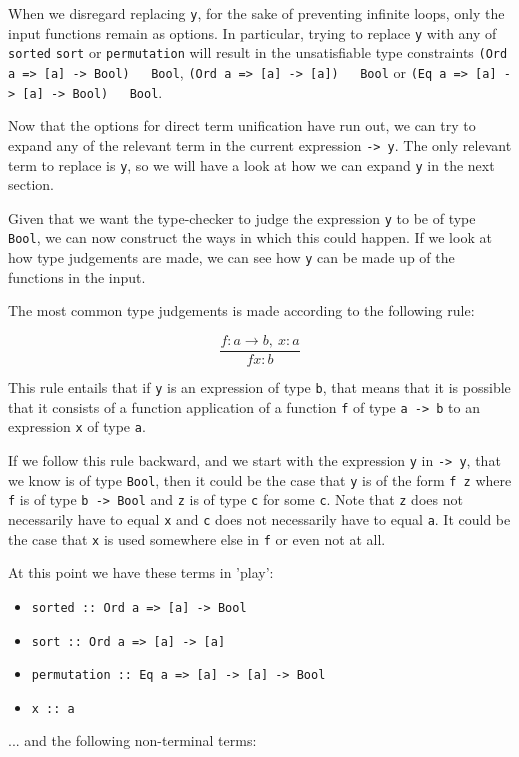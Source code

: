 \documentclass[a4paper, 11pt]{article}
\newcommand{\h}[1]{\texttt{#1}}
\begin{document}
When we disregard replacing \h{y}, for the sake of preventing infinite loops, only the input functions remain as options.
In particular, trying to replace \h{y} with any of \h{sorted} \h{sort} or \h{permutation} will result in the unsatisfiable type constraints \h{(Ord a => [a] -> Bool) ~ Bool}, \h{(Ord a => [a] -> [a]) ~ Bool} or \h{(Eq a => [a] -> [a] -> Bool) ~ Bool}.

Now that the options for direct term unification have run out, we can try to expand any of the relevant term in the current expression \h{\x -> y}.
The only relevant term to replace is \h{y}, so we will have a look at how we can expand \h{y} in the next section.


Given that we want the type-checker to judge the expression \h{y} to be of type \h{Bool}, we can now construct the ways in which this could happen.
If we look at how type judgements are made, we can see how \h{y} can be made up of the functions in the input.

The most common type judgements is made according to the following rule:

\[
  \frac{f : a \rightarrow b,\ x : a}{f x : b}
\]

This rule entails that if \h{y} is an expression of type \h{b}, that means that it is possible that it consists of a function application of a function \h{f} of type \h{a -> b} to an expression \h{x} of type \h{a}.

If we follow this rule backward, and we start with the expression \h{y} in \h{\x -> y}, that we know is of type \h{Bool}, then it could be the case that \h{y} is of the form \h{f z} where \h{f} is of type \h{b -> Bool} and \h{z} is of type \h{c} for some \h{c}.
Note that \h{z} does not necessarily have to equal \h{x} and \h{c} does not necessarily have to equal \h{a}.
It could be the case that \h{x} is used somewhere else in \h{f} or even not at all.

At this point we have these terms in 'play':

\begin{itemize}
  \item \h{sorted :: Ord a => [a] -> Bool}
  \item \h{sort :: Ord a => [a] -> [a]}
  \item \h{permutation :: Eq a => [a] -> [a] -> Bool}
  \item \h{x :: a}
\end{itemize}

... and the following non-terminal terms:
\end{document}
